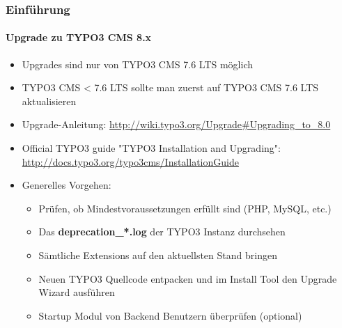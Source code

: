 \begin{frame}[fragile]
	\frametitle{Einführung}
	\framesubtitle{Upgrade zu TYPO3 CMS 8.x}

	\begin{itemize}
		\item Upgrades sind nur von TYPO3 CMS 7.6 LTS möglich
		\item TYPO3 CMS < 7.6 LTS sollte man zuerst auf TYPO3 CMS 7.6 LTS aktualisieren
	\end{itemize}

	\begin{itemize}

		\item Upgrade-Anleitung:\newline
			\smaller\url{http://wiki.typo3.org/Upgrade#Upgrading_to_8.0}\normalsize
		\item Official TYPO3 guide "TYPO3 Installation and Upgrading":
			\smaller\url{http://docs.typo3.org/typo3cms/InstallationGuide}\normalsize
		\item Generelles Vorgehen:
			\begin{itemize}
				\item Prüfen, ob Mindestvoraussetzungen erfüllt sind \small(PHP, MySQL, etc.)
				\item Das \textbf{deprecation\_*.log} der TYPO3 Instanz durchsehen
				\item Sämtliche Extensions auf den aktuellsten Stand bringen
				\item Neuen TYPO3 Quellcode entpacken und im Install Tool den Upgrade Wizard ausführen
				\item Startup Modul von Backend Benutzern überprüfen (optional)
			\end{itemize}
	\end{itemize}

\end{frame}



